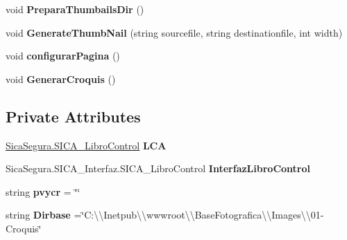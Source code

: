 \begin{DoxyCompactItemize}
\item 
void {\bfseries Prepara\+Thumbails\+Dir} ()\hypertarget{class_s_i_c_a_h___galeria__galeria_ac8aadd8d535b52d8e2117560cd5803b1}{}\label{class_s_i_c_a_h___galeria__galeria_ac8aadd8d535b52d8e2117560cd5803b1}

\item 
void {\bfseries Generate\+Thumb\+Nail} (string sourcefile, string destinationfile, int width)\hypertarget{class_s_i_c_a_h___galeria__galeria_a29c1269960bdd71448aab3bc51b4ee68}{}\label{class_s_i_c_a_h___galeria__galeria_a29c1269960bdd71448aab3bc51b4ee68}

\item 
void {\bfseries configurar\+Pagina} ()\hypertarget{class_s_i_c_a_h___galeria__galeria_a5dce90bf1628bf8a761875eab63869d3}{}\label{class_s_i_c_a_h___galeria__galeria_a5dce90bf1628bf8a761875eab63869d3}

\item 
void {\bfseries Generar\+Croquis} ()\hypertarget{class_s_i_c_a_h___galeria__galeria_a8d25c739551a131344b0382f610cd429}{}\label{class_s_i_c_a_h___galeria__galeria_a8d25c739551a131344b0382f610cd429}

\end{DoxyCompactItemize}
\subsection*{Private Attributes}
\begin{DoxyCompactItemize}
\item 
\hyperlink{class_sica_segura_1_1_s_i_c_a___libro_control}{Sica\+Segura.\+S\+I\+C\+A\+\_\+\+Libro\+Control} {\bfseries L\+CA}\hypertarget{class_s_i_c_a_h___galeria__galeria_ae052d69fa1668ee037b82654155b462f}{}\label{class_s_i_c_a_h___galeria__galeria_ae052d69fa1668ee037b82654155b462f}

\item 
Sica\+Segura.\+S\+I\+C\+A\+\_\+\+Interfaz.\+S\+I\+C\+A\+\_\+\+Libro\+Control {\bfseries Interfaz\+Libro\+Control}\hypertarget{class_s_i_c_a_h___galeria__galeria_a49bda3dd97288c7ba28604295a8d7f6e}{}\label{class_s_i_c_a_h___galeria__galeria_a49bda3dd97288c7ba28604295a8d7f6e}

\item 
string {\bfseries pvycr} = \char`\"{}\char`\"{}\hypertarget{class_s_i_c_a_h___galeria__galeria_a63395fa9b80ed0a156ba13e15f949ef2}{}\label{class_s_i_c_a_h___galeria__galeria_a63395fa9b80ed0a156ba13e15f949ef2}

\item 
string {\bfseries Dirbase} =\char`\"{}C\+:\textbackslash{}\textbackslash{}\+Inetpub\textbackslash{}\textbackslash{}wwwroot\textbackslash{}\textbackslash{}\+Base\+Fotografica\textbackslash{}\textbackslash{}\+Images\textbackslash{}\textbackslash{}01-\/Croquis\char`\"{}\hypertarget{class_s_i_c_a_h___galeria__galeria_a11713d69252798356446d7956e115597}{}\label{class_s_i_c_a_h___galeria__galeria_a11713d69252798356446d7956e115597}

\end{DoxyCompactItemize}



